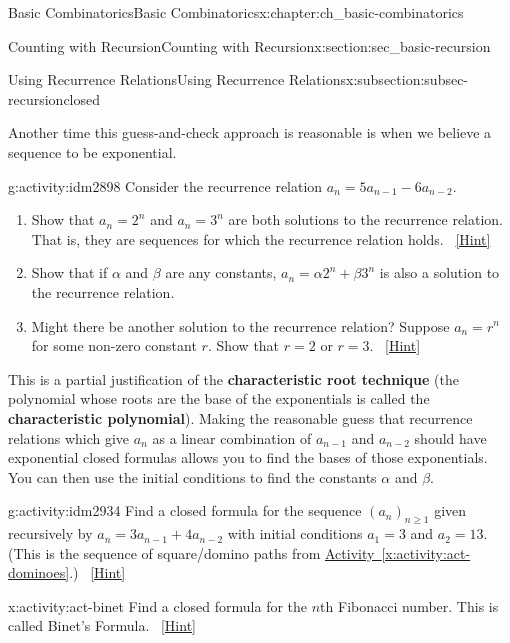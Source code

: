 \documentclass[oneside,10pt,]{book}
\newcommand{\terminology}[1]{\textbf{#1}}
\numberwithin{equation}{chapter}
\begin{document}
\begin{chapterptx}{Basic Combinatorics}{}{Basic Combinatorics}{}{}{x:chapter:ch_basic-combinatorics}
\begin{sectionptx}{Counting with Recursion}{}{Counting with Recursion}{}{}{x:section:sec_basic-recursion}
\begin{subsectionptx}{Using Recurrence Relations}{}{Using Recurrence Relations}{}{}{x:subsection:subsec-recursionclosed}
\par
Another time this guess-and-check approach is reasonable is when we believe a sequence to be exponential.%
\begin{activity}{}{g:activity:idm2898}%
Consider the recurrence relation \(a_n = 5a_{n-1} - 6a_{n-2}\).%
\begin{enumerate}[font=\bfseries,label=(\alph*),ref=\alph*]
\item{}Show that \(a_n = 2^n\) and \(a_n = 3^n\) are both solutions to the recurrence relation.  That is, they are sequences for which the recurrence relation holds.%
\qquad~\hfill{\tiny\hyperlink{g:hint:idm2907-back}{[Hint]}}\item{}Show that if \(\alpha\) and \(\beta\) are any constants, \(a_n = \alpha 2^n + \beta 3^n\) is also a solution to the recurrence relation.%
\item{}Might there be another solution to the recurrence relation?  Suppose \(a_n = r^n\) for some non-zero constant \(r\).  Show that \(r = 2\) or \(r = 3\).%
\qquad~\hfill{\tiny\hyperlink{g:hint:idm2922-back}{[Hint]}}\end{enumerate}
\end{activity}
This is a partial justification of the \terminology{characteristic root technique} (the polynomial whose roots are the base of the exponentials is called the \terminology{characteristic polynomial}).  Making the reasonable guess that recurrence relations which give \(a_n\) as a linear combination of \(a_{n-1}\) and \(a_{n-2}\) should have exponential closed formulas allows you to find the bases of those exponentials.  You can then use the initial conditions to find the constants \(\alpha\) and \(\beta\).%
\begin{activity}{}{g:activity:idm2934}%
Find a closed formula for the sequence \((a_n)_{n \ge 1}\) given recursively by \(a_n = 3a_{n-1} + 4a_{n-2}\) with initial conditions \(a_1 = 3\) and \(a_2 = 13\).  (This is the sequence of square\slash{}domino paths from \hyperref[x:activity:act-dominoes]{Activity~\ref{x:activity:act-dominoes}}.)%
\qquad~\hfill{\tiny\hyperlink{g:hint:idm2942-back}{[Hint]}}\end{activity}
\begin{activity}{}{x:activity:act-binet}%
Find a closed formula for the \(n\)th Fibonacci number.  This is called Binet's Formula.%
\qquad~\hfill{\tiny\hyperlink{g:hint:idm2954-back}{[Hint]}}\end{activity}
\end{subsectionptx}
%
%
\typeout{************************************************}

\end{sectionptx}
\end{chapterptx}
\end{document}
